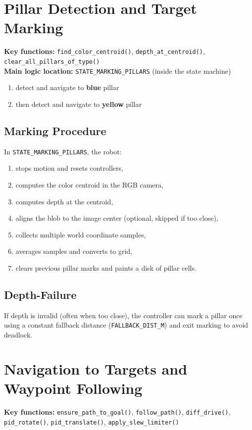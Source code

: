 \documentclass[12pt,a4paper]{article}
\begin{document}
\section{Pillar Detection and Target Marking}
\textbf{Key functions:} \texttt{find\_color\_centroid()}, \texttt{depth\_at\_centroid()},
\texttt{clear\_all\_pillars\_of\_type()} \\
\textbf{Main logic location:} \texttt{STATE\_MARKING\_PILLARS} (inside the state machine)

\begin{enumerate}[leftmargin=2em]
  \item detect and navigate to \textbf{blue} pillar
  \item then detect and navigate to \textbf{yellow} pillar
\end{enumerate}

\subsection{Marking Procedure}
In \texttt{STATE\_MARKING\_PILLARS}, the robot:
\begin{enumerate}[leftmargin=2em]
  \item stops motion and resets controllers,
  \item computes the color centroid in the RGB camera,
  \item computes depth at the centroid,
  \item aligns the blob to the image center (optional, skipped if too close),
  \item collects multiple world coordinate samples,
  \item averages samples and converts to grid,
  \item clears previous pillar marks and paints a disk of pillar cells.
\end{enumerate}

\subsection{Depth-Failure}
If depth is invalid (often when too close), the controller can mark a pillar once using a constant fallback distance (\texttt{FALLBACK\_DIST\_M}) and exit marking to avoid deadlock.

\section{Navigation to Targets and Waypoint Following}
\textbf{Key functions:} \texttt{ensure\_path\_to\_goal()}, \texttt{follow\_path()},
\texttt{diff\_drive()}, \texttt{pid\_rotate()}, \texttt{pid\_translate()}, \texttt{apply\_slew\_limiter()}
\end{document}
